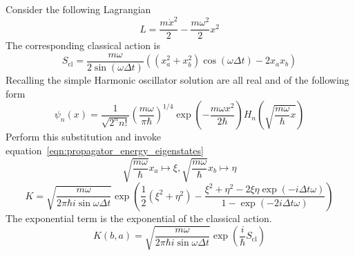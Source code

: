 \begin{example}
    Consider the following Lagrangian 
    \[L=\dfrac {m \dot x^2}{2} - \dfrac{m \omega^2}{2}x^2\]
    The corresponding classical action is 
    \[
        S_{\mathrm{cl}}=\frac{m \omega}{2 \sin(\omega \Delta t)}   \left(\left(x_a^2+x_b^2\right) \cos (\omega  \Delta t)-2 x_a x_b\right)
    \]
    Recalling the simple Harmonic oscillator solution are all real and of the following form 
    \[\psi_n(x)=\dfrac 1 {\sqrt{2^nn!}}\left(\dfrac{m\omega}{\pi \hbar}\right)^{1/4}\exp\left(-\dfrac{m\omega x^2}{2\hbar}\right) 
        H_n \left(\sqrt{\dfrac{m\omega}{\hbar}x}\right)\]
    Perform this substitution and invoke equation~\ref{eqn:propagator_energy_eigenstates}
    \[
        \sqrt{\dfrac{m\omega}{\hbar}}x_a\mapsto \xi, \sqrt{\dfrac{m\omega}{\hbar}}x_b\mapsto \eta
    \]
    \[ 
        K=\sqrt{\dfrac{m\omega}{2\pi \hbar i \sin \omega \Delta t}}
            \exp \left(\dfrac 1 2 (\xi^2+\eta^2)-\dfrac{\xi^2+\eta^2 - 2\xi\eta \exp(-i\Delta t \omega)}{1-\exp(-2i\Delta t\omega)}\right)
    \]
    The exponential term is the exponential of the classical action. 
    \begin{equation}
        K(b, a)=\sqrt{\dfrac{m\omega}{2\pi \hbar i \sin \omega \Delta t}}\exp\left(\dfrac i \hbar S_\mathrm{cl}\right)
    \end{equation}
\end{example}

